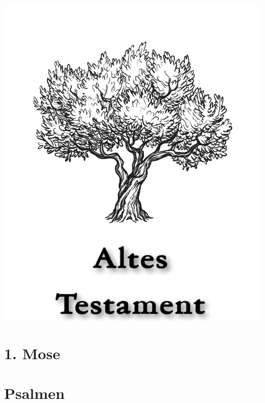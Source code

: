 \documentclass[14pt, b5paper, twoside]{extbook}
\begin{document}
\tableofcontents
\newpage

\null\vfill
\begin{center}
\begin{minipage}[c]{\textwidth}
  \begin{center}
  \includegraphics{AltesTestamentTitel.pdf}
  \end{center}
\end{minipage}
\end{center}
\null\vfill
\newpage

\pagestyle{bible}

\renewcommand{\cleardoublepage}{}
\renewcommand{\clearpage}{}

\chapter{1. Mose}
\begin{multicols}{2}
  
\end{multicols}

\chapter{Psalmen}
\begin{multicols}{2}
  
\end{multicols}
\end{document}
